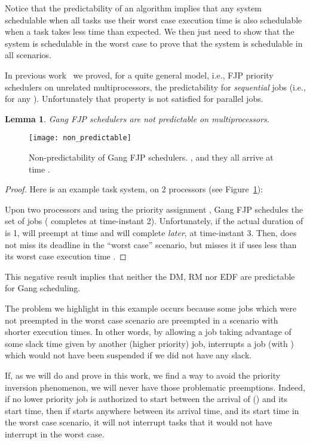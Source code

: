 \documentclass[a4paper]{article}
\newtheorem{lemma}[theorem]{Lemma}
\begin{document}
Notice that the predictability of an algorithm implies that any system schedulable when all tasks use their worst case execution time is also schedulable when a task takes less time than expected. We then just need to show that the system is schedulable in the worst case to prove that the system is schedulable in all scenarios.


In previous work~\cite{Cucu-Grosjean2009Predictability-} we proved, for a quite general model, i.e., FJP priority schedulers on unrelated multiprocessors, the predictability for \emph{sequential} jobs (i.e.,  for any ). Unfortunately that property is not satisfied for parallel jobs.

\begin{lemma}\label{lem:notPredict}
Gang FJP schedulers are not predictable on multiprocessors.
\end{lemma}

\begin{figure}
\begin{center}
\texttt{[image: non\_predictable]}
\caption{\label{fig:notPredictable}Non-predictability of Gang FJP schedulers. , and they all arrive at time .} 
\end{center}\end{figure}

\begin{proof}
Here is an example task system, on 2 processors (see Figure~\ref{fig:notPredictable}):

Upon two processors and using the priority assignment , Gang FJP schedules the set of jobs ( completes at time-instant 2). Unfortunately, if the actual duration of  is 1,  will preempt  at time  and  will complete \emph{later}, at time-instant 3. Then,  does not miss its deadline in the ``worst case'' scenario, but misses it if  uses less than its worst case execution time .
\end{proof}

This negative result implies that neither the DM, RM nor EDF are predictable for Gang scheduling. 

The problem we highlight in this example occurs because some jobs which were not preempted in the worst case scenario are preempted in a scenario with shorter execution times. In other words, by allowing a job  taking advantage of some slack time given by another (higher priority) job,  interrupts a job  (with ) which would not have been suspended if we did not have any slack.

If, as we will do and prove in this work, we find a way to avoid the priority inversion phenomenon, we will never have those problematic preemptions. Indeed, if no lower priority job  is authorized to start between the arrival of  () and its start time, then if  starts anywhere between its arrival time, and its start time in the worst case scenario, it will not interrupt tasks that it would not have interrupt in the worst case.
\end{document}
